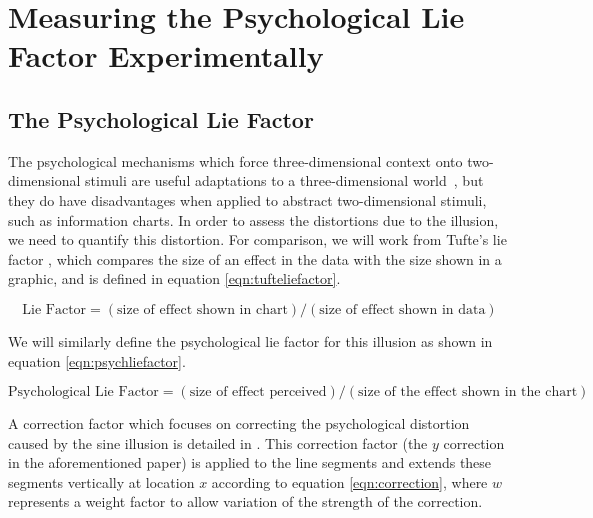 \documentclass[11pt]{isuthesis}\usepackage[]{graphicx}\usepackage[]{color}
\begin{document}
% 

\section{Measuring the Psychological Lie Factor Experimentally}
\subsection{The Psychological Lie Factor}

The psychological mechanisms which force three-dimensional context onto two-dimensional stimuli are useful adaptations to a three-dimensional world~\citep{gregory1968perceptual}, but they do have disadvantages when applied to abstract two-dimensional stimuli, such as information charts. In order to assess the distortions due to the illusion, we need to quantify this distortion. For comparison, we will work from Tufte's lie factor \citep[pg 57]{tufte}, which compares the size of an effect in the data with the size shown in a graphic, and is defined in equation \ref{eqn:tufteliefactor}.

\begin{equation}\label{eqn:tufteliefactor}
\text{Lie Factor} = (\text{size of effect shown in chart})/(\text{size of effect shown in data})
\end{equation}

\noindent We will similarly define the psychological lie factor for this illusion as shown in equation \ref{eqn:psychliefactor}. 

\begin{equation}\label{eqn:psychliefactor}
\text{Psychological Lie Factor} = (\text{size of effect perceived})/(\text{size of the effect shown in the chart})
\end{equation}

A correction factor which focuses on correcting the psychological distortion caused by the sine illusion is detailed in \citet{sineillusionjcgs}. This correction factor (the $y$ correction in the aforementioned paper) is applied to the line segments and extends these segments vertically at location $x$ according to equation \eqref{eqn:correction}, where $w$ represents a weight factor to allow variation of the strength of the correction. 
\end{document}
